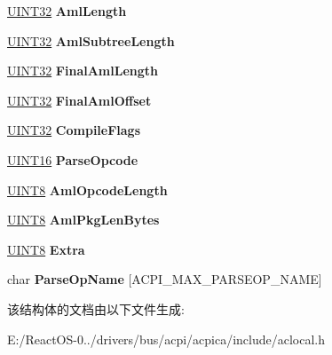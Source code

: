 \begin{DoxyCompactItemize}
\hyperlink{_processor_bind_8h_ae1e6edbbc26d6fbc71a90190d0266018}{U\+I\+N\+T32} {\bfseries Aml\+Length}
\item 
\mbox{\label{structacpi__parse__obj__asl_a84579637cf34a980c66c257a7140ff26}} 
\hyperlink{_processor_bind_8h_ae1e6edbbc26d6fbc71a90190d0266018}{U\+I\+N\+T32} {\bfseries Aml\+Subtree\+Length}
\item 
\mbox{\label{structacpi__parse__obj__asl_a30f7605a2bace5af49560838b2d0427c}} 
\hyperlink{_processor_bind_8h_ae1e6edbbc26d6fbc71a90190d0266018}{U\+I\+N\+T32} {\bfseries Final\+Aml\+Length}
\item 
\mbox{\label{structacpi__parse__obj__asl_a1b3ebe92503b8c0e6a6e561cc74c844f}} 
\hyperlink{_processor_bind_8h_ae1e6edbbc26d6fbc71a90190d0266018}{U\+I\+N\+T32} {\bfseries Final\+Aml\+Offset}
\item 
\mbox{\label{structacpi__parse__obj__asl_a0f70b85641b261c939df7644b2f5b600}} 
\hyperlink{_processor_bind_8h_ae1e6edbbc26d6fbc71a90190d0266018}{U\+I\+N\+T32} {\bfseries Compile\+Flags}
\item 
\mbox{\label{structacpi__parse__obj__asl_a39360a7dc55b119c8bfd2fbedab885ce}} 
\hyperlink{_processor_bind_8h_a09f1a1fb2293e33483cc8d44aefb1eb1}{U\+I\+N\+T16} {\bfseries Parse\+Opcode}
\item 
\mbox{\label{structacpi__parse__obj__asl_a0c7a17f1cf2edf54829aabb5c55cb4a2}} 
\hyperlink{_processor_bind_8h_ab27e9918b538ce9d8ca692479b375b6a}{U\+I\+N\+T8} {\bfseries Aml\+Opcode\+Length}
\item 
\mbox{\label{structacpi__parse__obj__asl_aa0904439b4c2b3f94b0ded2174e999ec}} 
\hyperlink{_processor_bind_8h_ab27e9918b538ce9d8ca692479b375b6a}{U\+I\+N\+T8} {\bfseries Aml\+Pkg\+Len\+Bytes}
\item 
\mbox{\label{structacpi__parse__obj__asl_a40154ee9b5e3611660cdcc530cca0c05}} 
\hyperlink{_processor_bind_8h_ab27e9918b538ce9d8ca692479b375b6a}{U\+I\+N\+T8} {\bfseries Extra}
\item 
\mbox{\label{structacpi__parse__obj__asl_a531697571a663c8a2443577681c6bd4b}} 
char {\bfseries Parse\+Op\+Name} \mbox{[}A\+C\+P\+I\+\_\+\+M\+A\+X\+\_\+\+P\+A\+R\+S\+E\+O\+P\+\_\+\+N\+A\+ME\mbox{]}
\end{DoxyCompactItemize}


该结构体的文档由以下文件生成\+:\begin{DoxyCompactItemize}
\item 
E\+:/\+React\+O\+S-\/0../drivers/bus/acpi/acpica/include/aclocal.\+h\end{DoxyCompactItemize}
